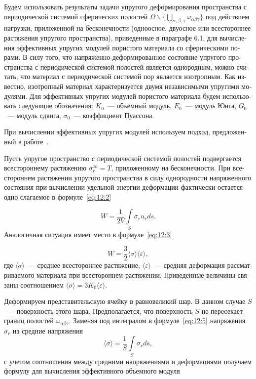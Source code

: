\begin{russian}
Будем использовать результаты задачи упругого деформирования пространства с периодической системой сферических полостей $\Omega\backslash\bigg\{\bigcup\limits_{\alpha,\beta,\gamma}\omega_{\alpha\beta\gamma}\bigg\}$ под действием нагрузки, приложенной на бесконечности (одноосное, двуосное или всестороннее растяжения упругого пространства), приведенные в параграфе 6.1, для вычисления эффективных упругих модулей пористого материала со сферическими порами. В силу того, что на\-пряжен\-но-де\-фор\-ми\-ро\-ван\-ное состояние упругого пространства с периодической системой полостей является однородным, можно считать, что материал с периодической системой пор является изотропным. Как известно, изотропный материал характеризуется двумя независимыми упругими модулями. Для эффективных упругих модулей пористого материала будем использовать следующие обозначения: $K_0$~--- объемный модуль, $E_0$~--- модуль Юнга, $G_0$~--- модуль сдвига, $\sigma_0$~--- коэффициент Пуассона.

При вычислении эффективных упругих модулей используем подход, предложенный в работе~\cite{Vanin1985}.

Пусть упругое пространство с периодической системой полостей подвергается всестороннему растяжению $\sigma_r^\infty=T$, приложенному на бесконечности. При всестороннем растяжении упругого пространства в силу однородности напряженного состояния при вычислении удельной энергии деформации фактически остается одно слагаемое в формуле~\eqref{eq:12:2}

\begin{equation}
W=\frac{1}{2V}\int\limits_S\sigma_{r}u_r ds.
\label{eq:12:5}
\end{equation}
Аналогичная ситуация имеет место в формуле~\eqref{eq:12:3}~\cite{Vanin1985}

\begin{equation}
W=\frac{3}{2}\langle\sigma\rangle\langle\varepsilon\rangle,
\label{eq:12:6}
\end{equation}
где $\langle\sigma\rangle$~--- среднее всестороннее растяжение; $\langle\varepsilon\rangle$~--- средняя деформация рассматриваемого материала при всестороннем растяжении. Приведенные величины связаны соотношением $\langle\sigma\rangle=3K_0\langle\varepsilon\rangle$.

Деформируем представительскую ячейку в равновеликий шар. В данном случае $S$~--- поверхность этого шара. Предполагается, что поверхность $S$ не пересекает границ полостей $\omega_{\alpha\beta\gamma}$. Заменяя под интегралом в формуле~\eqref{eq:12:5} напряжения $\sigma_r$ на средние напряжения
$$
\langle\sigma\rangle=\frac{1}{S}\int\limits_S\sigma_r ds,
$$
с учетом соотношения между средними напряжениями и деформациями получаем формулу для вычисления эффективного объемного модуля


\end{russian}

